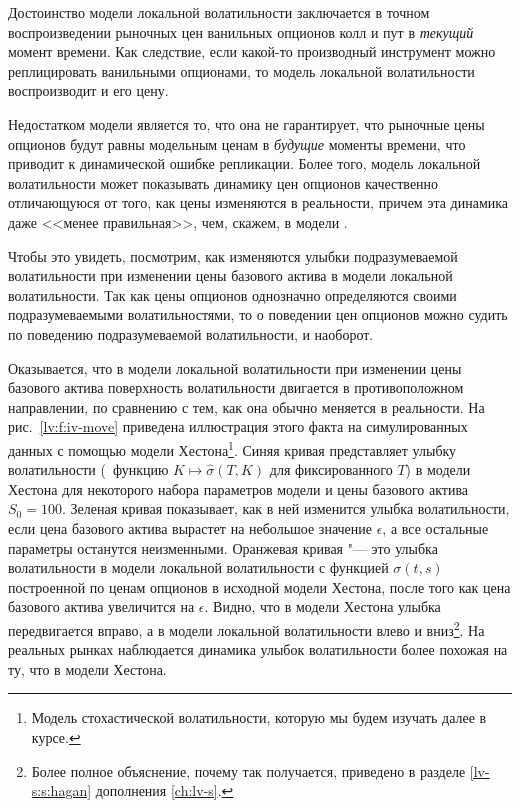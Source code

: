 Достоинство модели локальной волатильности заключается в точном воспроизведении рыночных цен ванильных опционов колл и пут в \emph{текущий} момент времени.
Как следствие, если какой-то производный инструмент можно реплицировать ванильными опционами, то модель локальной волатильности воспроизводит и его цену.

Недостатком модели является то, что она не гарантирует, что рыночные цены опционов будут равны модельным ценам в \emph{будущие} моменты времени,
что приводит к динамической ошибке репликации.
Более того, модель локальной волатильности может показывать динамику цен опционов качественно отличающуюся от того, как цены изменяются в реальности, причем эта динамика даже <<менее правильная>>, чем, скажем, в модели \bs.

Чтобы это увидеть, посмотрим, как изменяются улыбки подразумеваемой волатильности при изменении цены базового актива в модели локальной волатильности. Так как цены опционов однозначно определяются своими подразумеваемыми волатильностями, то о поведении цен опционов можно судить по поведению подразумеваемой волатильности, и наоборот.

Оказывается, что в модели локальной волатильности при изменении цены базового актива поверхность волатильности двигается в противоположном направлении, по сравнению с тем, как она обычно меняется в реальности.
На рис.~\ref{lv:f:iv-move} приведена иллюстрация этого факта на симулированных данных с помощью модели Хестона\footnote{Модель стохастической волатильности, которую мы будем изучать далее в курсе.}.
Синяя кривая представляет улыбку волатильности (\te\ функцию $K\mapsto\hat\sigma(T,K)$ для фиксированного $T$) в модели Хестона для некоторого набора параметров модели и цены базового актива $S_0=100$.
Зеленая кривая показывает, как в ней изменится улыбка волатильности, если цена базового актива вырастет на небольшое значение $\epsilon$, а все остальные параметры останутся неизменными.
Оранжевая кривая "--- это улыбка волатильности в модели локальной волатильности с функцией $\sigma(t,s)$ построенной по ценам опционов в исходной модели Хестона, после того как цена базового актива увеличится на $\epsilon$.
Видно, что в модели Хестона улыбка передвигается вправо, а в модели локальной волатильности влево и вниз\footnote{Более полное объяснение, почему так получается, приведено в разделе \ref{lv-s:s:hagan} дополнения \ref{ch:lv-s}.}.
На реальных рынках наблюдается динамика улыбок волатильности более похожая на ту, что в модели Хестона.


